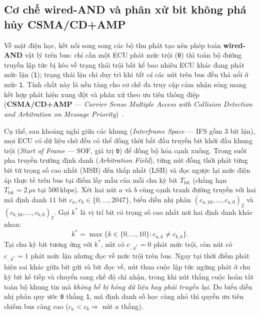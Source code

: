 \documentclass[12pt, a4paper, reqno, oneside]{book}
\begin{document}
\subsection{Cơ chế wired-AND và phân xử bit không phá hủy CSMA/CD+AMP}
Về mặt điện học, kết nối song song các bộ thu phát tạo nên phép toán \textbf{wired-AND} vật lý trên bus: chỉ cần một ECU phát mức trội (\texttt{0}) thì toàn bộ đường truyền lập tức bị kéo về trạng thái trội bất kể bao nhiêu ECU khác đang phát mức lặn (\texttt{1}); trạng thái lặn chỉ duy trì khi \emph{tất cả} các nút trên bus đều thả nổi ở mức \texttt{1}. Tính chất này là nền tảng cho cơ chế đa truy cập cảm nhận sóng mang kết hợp phát hiện xung đột và phân xử theo ưu tiên thông điệp (\textbf{CSMA/CD+AMP} --- \textit{Carrier Sense Multiple Access with Collision Detection and Arbitration on Message Priority})~\cite{bosch1991can,iso11898_1_2015}.

Cụ thể, sau khoảng nghỉ giữa các khung (\textit{Interframe Space} --- IFS gồm $3$ bit lặn), mọi ECU có dữ liệu chờ đều có thể đồng thời bắt đầu truyền bit khởi đầu khung trội (\textit{Start of Frame} --- SOF, giá trị \texttt{0}) để đồng bộ hóa cạnh xuống. Trong suốt pha truyền trường định danh (\textit{Arbitration Field}), từng nút đồng thời phát từng bit từ trọng số cao nhất (MSB) đến thấp nhất (LSB) và đọc ngược lại mức điện áp thực tế trên bus tại điểm lấy mẫu của mỗi chu kỳ bit $T_{\text{bit}}$ (chẳng hạn $T_{\text{bit}} = 2\,\mu\text{s}$ tại $500\,\text{kbps}$). Xét hai nút $a$ và $b$ cùng cạnh tranh đường truyền với hai mã định danh $11$ bit $c_a, c_b \in \{0, \ldots, 2047\}$, biểu diễn nhị phân $(c_{a,10}, \ldots, c_{a,0})_2$ và $(c_{b,10}, \ldots, c_{b,0})_2$. Gọi $k^*$ là vị trí bit có trọng số cao nhất nơi hai định danh khác nhau:
\begin{equation}\label{eq:can-arbitration}
k^* = \max\big\{k \in \{0, \ldots, 10\} : c_{a,k} \neq c_{b,k}\big\}.
\end{equation}
Tại chu kỳ bit tương ứng với $k^*$, nút có $c_{\cdot, k^*} = 0$ phát mức trội, còn nút có $c_{\cdot, k^*} = 1$ phát mức lặn nhưng đọc về mức trội trên bus. Ngay tại thời điểm phát hiện sai khác giữa bit gửi và bit đọc về, nút thua cuộc lập tức ngừng phát ở chu kỳ bit kế tiếp và chuyển sang chế độ chỉ nhận, trong khi nút thắng cuộc hoàn tất toàn bộ khung tin mà \emph{không hề bị hỏng dữ liệu hay phải truyền lại}. Do biểu diễn nhị phân quy ước \texttt{0} thắng \texttt{1}, mã định danh số học càng nhỏ thì quyền ưu tiên chiếm bus càng cao ($c_a < c_b \Rightarrow$ nút $a$ thắng).
\end{document}
